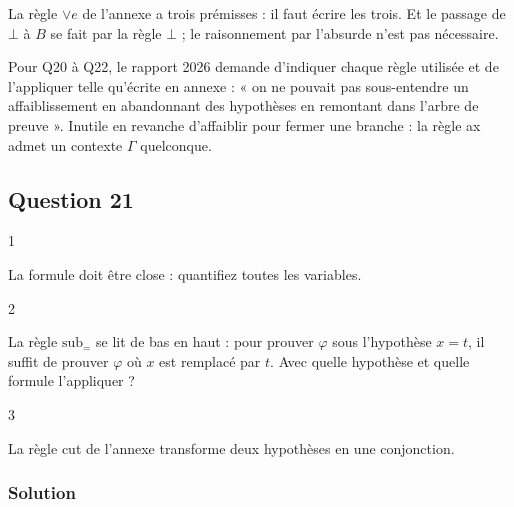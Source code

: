 \documentclass[11pt,a4paper]{article}
\begin{document}
\begin{piege}

La règle \(\vee e\) de l'annexe a trois prémisses : il faut écrire les trois. Et le passage de \(\bot\) à \(B\) se fait par la règle \(\bot\) ; le raisonnement par l'absurde n'est pas nécessaire.

\end{piege}

\begin{jury}

Pour Q20 à Q22, le rapport 2026 demande d'indiquer chaque règle utilisée et de l'appliquer telle qu'écrite en annexe : « on ne pouvait pas sous-entendre un affaiblissement en abandonnant des hypothèses en remontant dans l'arbre de preuve ». Inutile en revanche d'affaiblir pour fermer une branche : la règle ax admet un contexte \(\Gamma\) quelconque.

\end{jury}

\hypertarget{question-21}{%
\subsection{Question 21}\label{question-21}}

\begin{indication}{1}

La formule doit être close : quantifiez toutes les variables.

\end{indication}

\begin{indication}{2}

La règle \({\mathrm{sub}}_=\) se lit de bas en haut : pour prouver \(\varphi\) sous l'hypothèse \(x=t\), il suffit de prouver \(\varphi\) où \(x\) est remplacé par \(t\). Avec quelle hypothèse et quelle formule l'appliquer ?

\end{indication}

\begin{indication}{3}

La règle cut de l'annexe transforme deux hypothèses en une conjonction.

\end{indication}

\hypertarget{solution-20}{%
\subsubsection{Solution}\label{solution-20}}
\end{document}
